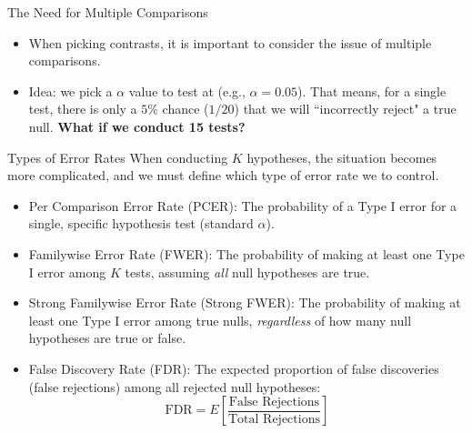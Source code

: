 \begin{frame}[allowframebreaks]{The Need for Multiple Comparisons}
  \begin{itemize}
    \item When picking contrasts, it is important to consider the issue of \alert{multiple comparisons}.
    \item Idea: we pick a $\alpha$ value to test at (e.g., $\alpha = 0.05$). That means, for a single test, there is only a $5\%$ chance ($1/20$) that we will ``incorrectly reject" a true null.
    \textbf{What if we conduct 15 tests?}
    
    
  \end{itemize}
\end{frame}

\begin{frame}[allowframebreaks]{Types of Error Rates}
When conducting $K$ hypotheses, the situation becomes more complicated, and we must define which type of error rate we to control.
 \begin{itemize}
    \item \alert{Per Comparison Error Rate (PCER)}: The probability of a Type I error for a single, specific hypothesis test (standard $\alpha$).
    \item \alert{Familywise Error Rate (FWER)}: The probability of making at least one Type I error among $K$ tests, assuming \emph{all} null hypotheses are true.
    \item \alert{Strong Familywise Error Rate (Strong FWER)}: The probability of making at least one Type I error among true nulls, \emph{regardless} of how many null hypotheses are true or false.
    \item \alert{False Discovery Rate (FDR)}: The expected proportion of false discoveries (false rejections) among all rejected null hypotheses:
    $$
    \text{FDR} = E\left[ \frac{\text{False Rejections}}{\text{Total Rejections}} \right]
    $$
  \end{itemize}
  
\end{frame}

